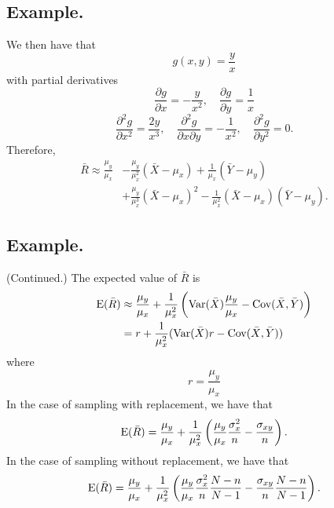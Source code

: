 \documentclass[titlepage]{article}
\begin{document}
\subsection{Example.} We then have that 
$$g(x, y) = \frac{y}{x}$$
with partial derivatives 
$$\frac{\partial g}{\partial x} = -\frac{y}{x^{2}}, \quad \frac{\partial g}{\partial y} = \frac{1}{x}$$
$$\frac{\partial^{2} g}{\partial x^{2}} = \frac{2y}{x^{3}}, \quad \frac{\partial^{2} g}{\partial x \partial y} = -\frac{1}{x^{2}}, \quad \frac{\partial^{2} g}{\partial y^{2}} = 0.$$
Therefore, 
\begin{align*}
    \bar{R} \approx \frac{\mu_{y}}{\mu_{x}} &- \frac{\mu_{y}}{\mu_{x}^{2}}(\bar{X} - \mu_{x}) + \frac{1}{\mu_{x}}(\bar{Y} - \mu_{y}) \\
                                            &+ \frac{\mu_{y}}{\mu_{x}^{3}}(\bar{X} - \mu_{x})^{2} - \frac{1}{\mu_{x}^{2}}(\bar{X} - \mu_{x})(\bar{Y} - \mu_{y}).
\end{align*}

\subsection{Example.} (Continued.) The expected value of $\bar{R}$ is 
\begin{align*}
    \text{E}(\bar{R}) &\approx \frac{\mu_{y}}{\mu_{x}} + \frac{1}{\mu_{x}^{2}}\left(\text{Var}(\bar{X})\frac{\mu_{y}}{\mu_{x}} - \text{Cov}(\bar{X}, \bar{Y})\right) \\
                &= r + \frac{1}{\mu_{x}^{2}}(\text{Var}(\bar{X})r - \text{Cov}(\bar{X}, \bar{Y}))
\end{align*}
where 
$$r = \frac{\mu_{y}}{\mu_{x}}$$
In the case of sampling with replacement, we have that
$$\text{E}(\bar{R}) = \frac{\mu_{y}}{\mu_{x}} + \frac{1}{\mu_{x}^{2}}\left(\frac{\mu_{y}}{\mu_{x}}\frac{\sigma_{x}^{2}}{n} - \frac{\sigma_{xy}}{n}\right).$$
In the case of sampling without replacement, we have that 
$$\text{E}(\bar{R}) = \frac{\mu_{y}}{\mu_{x}} + \frac{1}{\mu_{x}^{2}}\left(\frac{\mu_{y}}{\mu_{x}}\frac{\sigma_{x}^{2}}{n}\frac{N - n}{N - 1} - \frac{\sigma_{xy}}{n}\frac{N - n}{N - 1}\right).$$
\end{document}
